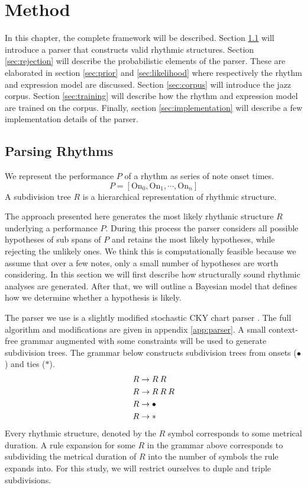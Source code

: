 \chapter{Method}
\label{sec:method}

In this chapter, the complete framework will be described. Section \ref{sec:parser} will introduce a parser that constructs valid rhythmic structures. Section \ref{sec:rejection} will describe the probabilistic elements of the parser. These are elaborated in section \ref{sec:prior} and \ref{sec:likelihood} where respectively the rhythm and expression model are discussed. Section \ref{sec:corpus} will introduce the jazz corpus. Section \ref{sec:training} will describe how the rhythm and expression model are trained on the corpus. Finally, section \ref{sec:implementation} will describe a few implementation details of the parser.

\section{Parsing Rhythms}
\label{sec:parser}

We represent the performance $P$ of a rhythm as series of note onset times. 
\begin{equation}
\label{eq:performance}
P = [\mathrm{On}_0, \mathrm{On}_1, \cdots, \mathrm{On}_n]
\end{equation}
A subdivision tree $R$ is a hierarchical representation of rhythmic structure.

The approach presented here generates the most likely rhythmic structure $R$ underlying a performance $P$. During this process the parser considers all possible hypotheses of sub spans of $P$ and retains the most likely hypotheses, while rejecting the unlikely ones. We think this is computationally feasible because we assume that over a few notes, only a small number of hypotheses are worth considering. In this section we will first describe how structurally sound rhythmic analyses are generated. After that, we will outline a Bayesian model that defines how we determine whether a hypothesis is likely.

The parser we use is a slightly modified stochastic CKY chart parser \citep{Younger1967recognition}. The full algorithm and modifications are given in appendix \ref{app:parser}. A small context-free grammar augmented with some constraints will be used to generate subdivision trees. The grammar below constructs subdivision trees from onsets ($\bullet$) and ties ($*$).
\begin{align}
R &\rightarrow R\: R\\ \notag
R &\rightarrow R\: R\: R\\ \notag
R &\rightarrow \bullet\\ \notag
R &\rightarrow * \notag
\end{align}
Every rhythmic structure, denoted by the $R$ symbol corresponds to some metrical duration. A rule expansion for some $R$ in the grammar above corresponds to subdividing the metrical duration of $R$ into the number of symbols the rule expands into. For this study, we will restrict ourselves to duple and triple subdivisions.

